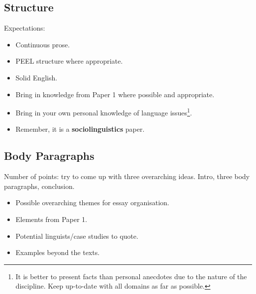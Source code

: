\documentclass[../main.tex]{subfiles}
\begin{document}
    \subsection{Structure}
    Expectations:
    \begin{itemize}
        \item Continuous prose.
        \item PEEL structure where appropriate.
        \item Solid English.
        \item Bring in knowledge from Paper 1 where possible and appropriate.
        \item Bring in your own personal knowledge of language issues\footnote{It is better to present facts than personal anecdotes due to the nature of the discipline. Keep up-to-date with all domains as far as possible.}.
        \item Remember, it is a \textbf{sociolinguistics} paper.
    \end{itemize}
    
    \subsection{Body Paragraphs}
        Number of points: try to come up with three overarching ideas. Intro, three body paragraphs, conclusion. 
        \begin{itemize}
            \item Possible overarching themes for essay organisation.
            \item Elements from Paper 1.
            \item Potential linguists/case studies to quote.
            \item Examples beyond the texts.
        \end{itemize}
\end{document}
